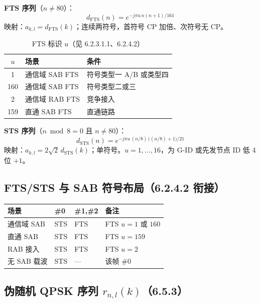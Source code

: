\documentclass[11pt,a4paper]{ctexart}
\begin{document}
\textbf{FTS 序列}（$n{\neq}80$）：
\begin{equation}
d_{\mathrm{FTS}}(n) = e^{-j\pi u\, n (n+1) / 161}
\end{equation}
映射：$a_{k,l} = d_{\mathrm{FTS}}(k)$；连续两符号，首符号 CP 加倍、次符号无 CP。

\begin{table}[h]
\centering
\small
\begin{tabular}{cll}
\toprule
\textbf{$u$} & \textbf{场景} & \textbf{条件} \\
\midrule
1 & 通信域 SAB FTS & 符号类型一 A/B 或类型四 \\
160 & 通信域 SAB FTS & 符号类型二或三 \\
2 & 通信域 RAB FTS & 竞争接入 \\
159 & 直通 SAB FTS & 直通链路 \\
\bottomrule
\end{tabular}
\caption{FTS 标识 $u$（见 6.2.3.1.1、6.2.4.2）}
\end{table}

\textbf{STS 序列}（$n \bmod 8 = 0$ 且 $n{\neq}80$）：
\begin{equation}
d_{\mathrm{STS}}(n) = e^{-j\pi u\, (n/8)\, \bigl((n/8)+1\bigr) / 21}
\end{equation}
映射：$a_{k,l} = 2\sqrt{2}\, d_{\mathrm{STS}}(k)$；单符号。$u = 1,\ldots,16$，为 G-ID 或先发节点 ID 低 4 位 $+1$。

\subsection{FTS/STS 与 SAB 符号布局（6.2.4.2 衔接）}

\begin{table}[h]
\centering
\small
\begin{tabular}{llll}
\toprule
\textbf{场景} & \textbf{\#0} & \textbf{\#1,\#2} & \textbf{备注} \\
\midrule
通信域 SAB & STS & FTS & FTS $u{=}1$ 或 $160$ \\
直通 SAB & STS & FTS & FTS $u{=}159$ \\
RAB 接入 & STS & FTS & FTS $u{=}2$ \\
无 SAB 载波 & STS & --- & 该帧 \#0 \\
\bottomrule
\end{tabular}
\end{table}

\subsection{伪随机 QPSK 序列 $r_{n,l}(k)$（6.5.3）}
\end{document}
